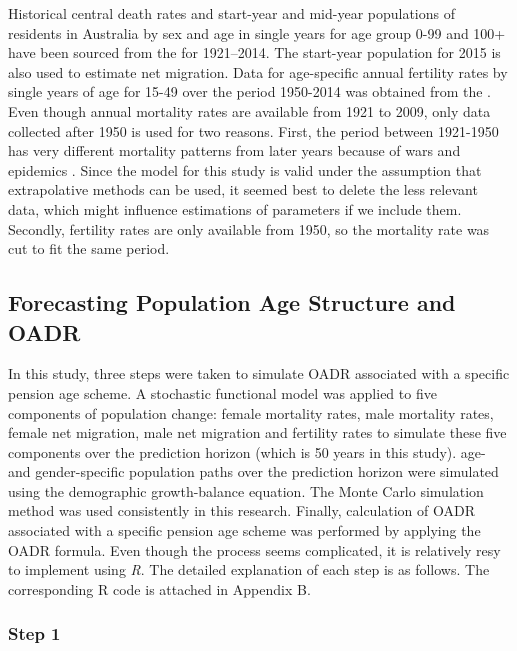 \documentclass[11pt,a4paper,]{article}
\begin{document}
Historical central death rates and start-year and mid-year populations
of residents in Australia by sex and age in single years for age group
0-99 and 100+ have been sourced from the \textcite{HMD} for 1921--2014.
The start-year population for 2015 is also used to estimate net
migration. Data for age-specific annual fertility rates by single years
of age for 15-49 over the period 1950-2014 was obtained from the
\textcite{ABS12}. Even though annual mortality rates are available from
1921 to 2009, only data collected after 1950 is used for two reasons.
First, the period between 1921-1950 has very different mortality
patterns from later years because of wars and epidemics \autocite{HB08}.
Since the model for this study is valid under the assumption that
extrapolative methods can be used, it seemed best to delete the less
relevant data, which might influence estimations of parameters if we
include them. Secondly, fertility rates are only available from 1950, so
the mortality rate was cut to fit the same period.

\subsection{Forecasting Population Age Structure and
OADR}\label{sec:forecasting}

In this study, three steps were taken to simulate OADR associated with a
specific pension age scheme. A stochastic functional model was applied
to five components of population change: female mortality rates, male
mortality rates, female net migration, male net migration and fertility
rates to simulate these five components over the prediction horizon
(which is 50 years in this study). age- and gender-specific population
paths over the prediction horizon were simulated using the demographic
growth-balance equation. The Monte Carlo simulation method was used
consistently in this research. Finally, calculation of OADR associated
with a specific pension age scheme was performed by applying the OADR
formula. Even though the process seems complicated, it is relatively
resy to implement using \textit{R}. The detailed explanation of each
step is as follows. The corresponding R code is attached in Appendix B.

\subsubsection*{Step 1}\label{step-1}
\end{document}

